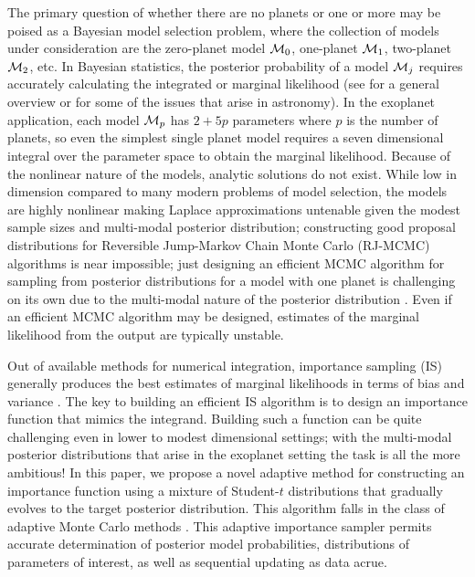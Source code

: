 The primary question of whether there are no planets or one or more
may be poised as a Bayesian model selection problem, where the
collection of models under consideration are the zero-planet model
${\cal{M}}_0$, one-planet ${\cal{M}}_1$, two-planet ${\cal{M}}_2$, etc.  In Bayesian
statistics, the posterior probability of a model ${\cal{M}}_j$ requires
accurately calculating the integrated or marginal likelihood (see
\citet{clyd:geor:2004} for a general overview or
\citet{clyd:etal:2007,ford2006bms} for some of the issues that arise in
astronomy).  In the exoplanet application, each model ${\cal{M}}_p$ has
$2+5p$ parameters where $p$ is the number of planets, so even the
simplest single planet model requires a seven dimensional integral
over the parameter space to obtain the marginal likelihood.  Because
of the nonlinear nature of the models, analytic solutions do not
exist.  While low in dimension compared to many modern problems of
model selection, the models are highly nonlinear making Laplace
approximations untenable given the modest sample sizes and multi-modal
posterior distribution; constructing good proposal distributions for
Reversible Jump-Markov Chain Monte Carlo (RJ-MCMC) algorithms is near
impossible; just designing an efficient MCMC algorithm for sampling
from posterior distributions for a model with one planet is
challenging on its own due to the multi-modal nature of the posterior
distribution \citep{ford2006bms}.   Even if an efficient MCMC
algorithm may be designed, estimates of the  marginal likelihood from
the output are typically unstable.


Out of available methods for numerical integration, importance
sampling (IS) generally produces the best estimates of marginal
likelihoods in terms of bias and variance . The key to building an efficient IS algorithm is to
design an importance function that mimics the integrand.  Building
such a function can be quite challenging even in lower to modest
dimensional settings; with the multi-modal posterior distributions
that arise in the exoplanet setting the task is all the more
ambitious!  In this paper, we propose a novel adaptive method for
constructing an importance function using a mixture of Student-$t$
distributions that gradually evolves to the target posterior
distribution.  This algorithm falls in the class of adaptive  Monte
Carlo methods \citep[see][for an overview and papers appearing in the
special issue on sequential Monte Carlo]{fern:2008}.  This adaptive
importance sampler permits accurate determination of posterior model
probabilities,  distributions of parameters of interest, as well as
sequential updating as data acrue.


